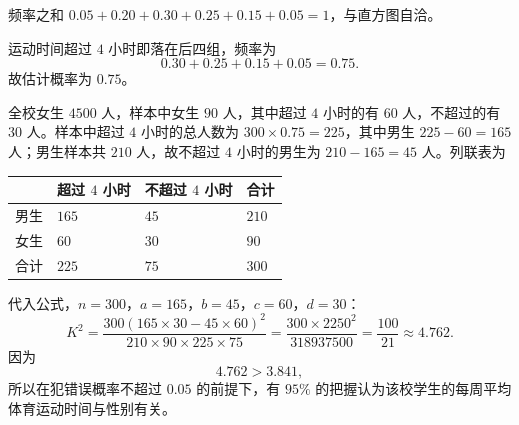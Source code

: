 \begin{answer}
频率之和 $0.05+0.20+0.30+0.25+0.15+0.05=1$，与直方图自洽。

运动时间超过 $4$ 小时即落在后四组，频率为
\nopagebreak[4]
\[0.30+0.25+0.15+0.05=0.75 .\]
故估计概率为 $0.75$。


全校女生 $4500$ 人，样本中女生 $90$ 人，其中超过 $4$ 小时的有 $60$ 人，不超过的有 $30$ 人。样本中超过 $4$ 小时的总人数为 $300\times0.75=225$，其中男生 $225-60=165$ 人；男生样本共 $210$ 人，故不超过 $4$ 小时的男生为 $210-165=45$ 人。列联表为

\begin{center}
\begin{tabular}{llll}
\toprule
 & 超过 $4$ 小时 & 不超过 $4$ 小时 & 合计 \\
\midrule
男生 & $165$ & $45$ & $210$ \\
女生 & $60$ & $30$ & $90$ \\
合计 & $225$ & $75$ & $300$ \\
\bottomrule
\end{tabular}
\end{center}

代入公式，$n=300$，$a=165$，$b=45$，$c=60$，$d=30$：
\nopagebreak[4]
\[K^2=\frac{300(165\times30-45\times60)^2}{210\times90\times225\times75}
=\frac{300\times2250^2}{318937500}
=\frac{100}{21}\approx4.762 .\]
因为
\nopagebreak[4]
\[4.762>3.841,\]
所以在犯错误概率不超过 $0.05$ 的前提下，有 $95\%$ 的把握认为该校学生的每周平均体育运动时间与性别有关。




\end{answer}
